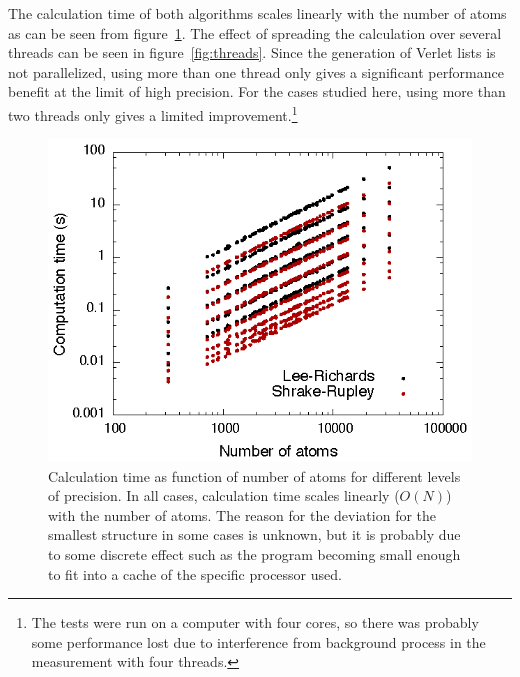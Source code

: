 \documentclass[a4paper,11pt]{article}
\begin{document}
\begin{small}
The calculation time of both algorithms scales linearly with the
number of atoms as can be seen from figure~\ref{fig:scaling}. The
effect of spreading the calculation over several threads can be seen
in figure~\ref{fig:threads}. Since the generation of Verlet lists is
not parallelized, using more than one thread only gives a significant
performance benefit at the limit of high precision. For the cases
studied here, using more than two threads only gives a limited
improvement.\footnote{The tests were run on a computer with four
  cores, so there was probably some performance lost due to
  interference from background process in the measurement with four
  threads.}
\begin{figure}
  \begin{center}
  \includegraphics{fig/scaling}
  \caption{Calculation time as function of number of atoms for
    different levels of precision. In all cases, calculation time
    scales linearly ($O(N)$) with the number of atoms. The reason for
    the deviation for the smallest structure in some cases is unknown,
    but it is probably due to some discrete effect such as the program
    becoming small enough to fit into a cache of the specific
    processor used.
    \label{fig:scaling}}
  \end{center}
\end{figure}
\begin{figure}
  \begin{center}

\end{center}
\end{figure}
\end{small}
\end{document}
